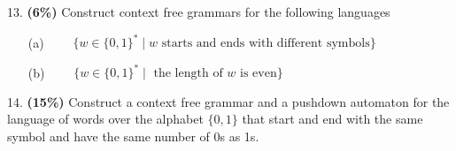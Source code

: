 \documentclass[11pt]{article}
\begin{document}
\medskip
\noindent
%
13. {\bf (6\%)} Construct context free grammars for the following languages
%
\begin{itemize}
 \item[(a)] {$\qquad \{ w \in \{0,1\}^* \mid w \text{ starts and ends with different symbols}\}$}
 \begin{itemize}
    \item[] {
  }
\end{itemize}
 \item[(b)] {$\qquad  \{ w \in \{0,1\}^* \mid \text{ the length of $w$ is even}\}$}
  \begin{itemize}
    \item[] {
  }
\end{itemize}
\end{itemize}




\newpage
\medskip
\noindent
%
14. {\bf (15\%)} Construct a context free grammar and a pushdown automaton for the  language of words over the alphabet $\{0,1\}$ that start and end with the same symbol and have the same number of 0s as 1s.
 \begin{itemize}
    \item[] {
  }
\end{itemize}
\end{document}
